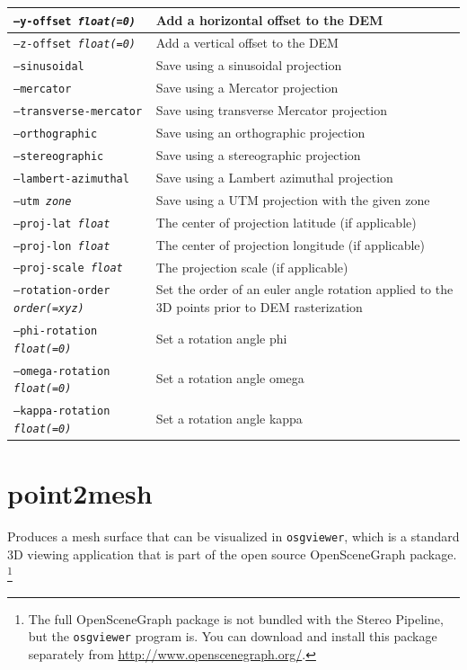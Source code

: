 \begin{longtable}{|l|p{10cm}|}
\texttt{--y-offset \textit{float(=0)}} & Add a horizontal offset to the \ac{DEM} \\ \hline
\texttt{--z-offset \textit{float(=0)}} & Add a vertical offset to the \ac{DEM} \\ \hline
\texttt{--sinusoidal} & Save using a sinusoidal projection \\ \hline
\texttt{--mercator} & Save using a Mercator projection \\ \hline
\texttt{--transverse-mercator} & Save using transverse Mercator projection \\ \hline
\texttt{--orthographic} & Save using an orthographic projection \\ \hline
\texttt{--stereographic} & Save using a stereographic projection \\ \hline
\texttt{--lambert-azimuthal} & Save using a Lambert azimuthal projection \\ \hline
\texttt{--utm \textit{zone}} & Save using a UTM projection with the given zone \\ \hline
\texttt{--proj-lat \textit{float}} & The center of projection latitude (if applicable) \\ \hline
\texttt{--proj-lon \textit{float}} & The center of projection longitude (if applicable) \\ \hline
\texttt{--proj-scale \textit{float}} & The projection scale (if applicable) \\ \hline
\texttt{--rotation-order \textit{order(=xyz)}} & Set the order of an euler angle rotation applied to the 3D points prior to \ac{DEM} rasterization \\ \hline
\texttt{--phi-rotation \textit{float(=0)}} & Set a rotation angle phi \\ \hline
\texttt{--omega-rotation \textit{float(=0)}} & Set a rotation angle omega \\ \hline
\texttt{--kappa-rotation \textit{float(=0)}} & Set a rotation angle kappa \\ \hline
\end{longtable}

\section{point2mesh}
\label{point2mesh}

Produces a mesh surface that can be visualized in {\tt osgviewer},
which is a standard 3D viewing application that is part of the open
source OpenSceneGraph package.  \footnote{The full OpenSceneGraph package
is not bundled with the Stereo Pipeline, but the \texttt{osgviewer} program
is.  You can download and install this package separately from 
\url{http://www.openscenegraph.org/}.}

